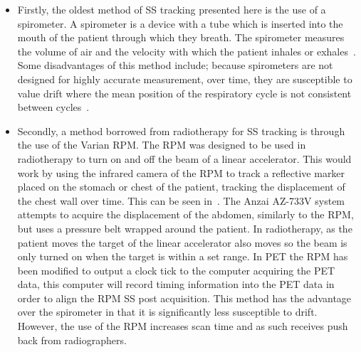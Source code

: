                 \begin{itemize}
                    \item Firstly, the oldest method of \gls{SS} tracking presented here is the use of a spirometer. A spirometer is a device with a tube which is inserted into the mouth of the patient through which they breath. The spirometer measures the volume of air and the velocity with which the patient inhales or exhales~\parencite{Guivarch2004SynchronizationPlethysmography}. Some disadvantages of this method include; %
                    because spirometers are not designed for highly accurate measurement, over time, they are susceptible to value drift where the mean position of the respiratory cycle is not consistent between cycles~\parencite{Hoisak2004}.
                    
                    \item Secondly, a method borrowed from radiotherapy for \gls{SS} tracking is through the use of the Varian \gls{RPM}. The \gls{RPM} was designed to be used in radiotherapy to turn on and off the beam of a linear accelerator. This would work by using the infrared camera of the \gls{RPM} to track a reflective marker placed on the stomach or chest of the patient, tracking the displacement of the chest wall over time. This can be seen in~. The Anzai AZ-733V system attempts to acquire the displacement of the abdomen, similarly to the \gls{RPM}, but uses a pressure belt wrapped around the patient. In radiotherapy, as the patient moves the target of the linear accelerator also moves so the beam is only turned on when the target is within a set range. In \gls{PET} the \gls{RPM} has been modified to output a clock tick to the computer acquiring the \gls{PET} data, this computer will %
                    record timing information into the \gls{PET} data in order to align the \gls{RPM} \gls{SS} post acquisition. This method has the advantage over the spirometer in that it is significantly less susceptible to drift. However, the use of the \gls{RPM} increases scan time and as such receives push back from radiographers.
                    

\end{itemize}
